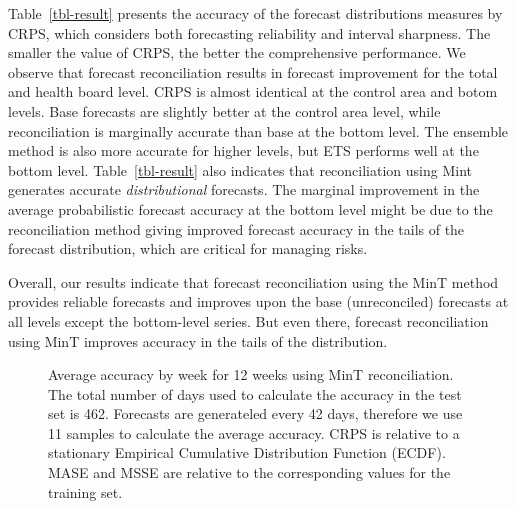 \documentclass[
  authoryear,
  preprint,
  3p]{elsarticle}
\begin{document}
Table~\ref{tbl-result} presents the accuracy of the forecast
distributions measures by CRPS, which considers both forecasting
reliability and interval sharpness. The smaller the value of CRPS, the
better the comprehensive performance. We observe that forecast
reconciliation results in forecast improvement for the total and health
board level. CRPS is almost identical at the control area and botom
levels. Base forecasts are slightly better at the control area level,
while reconciliation is marginally accurate than base at the bottom
level. The ensemble method is also more accurate for higher levels, but
ETS performs well at the bottom level. Table~\ref{tbl-result} also
indicates that reconciliation using Mint generates accurate
\emph{distributional} forecasts. The marginal improvement in the average
probabilistic forecast accuracy at the bottom level might be due to the
reconciliation method giving improved forecast accuracy in the tails of
the forecast distribution, which are critical for managing risks.

Overall, our results indicate that forecast reconciliation using the
MinT method provides reliable forecasts and improves upon the base
(unreconciled) forecasts at all levels except the bottom-level series.
But even there, forecast reconciliation using MinT improves accuracy in
the tails of the distribution.

\begin{figure}[H]


\caption{\label{fig-accuracy}Average accuracy by week for 12 weeks using
MinT reconciliation. The total number of days used to calculate the
accuracy in the test set is 462. Forecasts are generateled every 42
days, therefore we use 11 samples to calculate the average accuracy.
CRPS is relative to a stationary Empirical Cumulative Distribution
Function (ECDF). MASE and MSSE are relative to the corresponding values
for the training set.}

\end{figure}%
\end{document}
